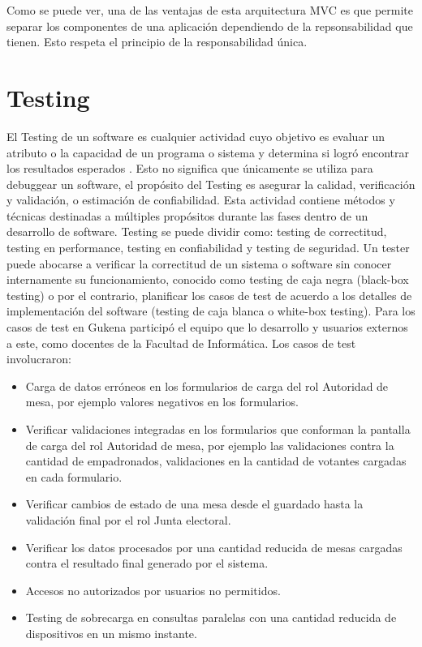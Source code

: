 Como se puede ver, una de las ventajas de esta arquitectura MVC es que permite separar los componentes de una aplicación dependiendo de la repsonsabilidad que tienen. Esto respeta el principio de la responsabilidad única.

\section{Testing}
El Testing de un software es cualquier actividad cuyo objetivo es evaluar un atributo o la capacidad de un programa o sistema y determina si logró encontrar los resultados esperados \cite{pan1999software}. Esto no significa que únicamente se utiliza para debuggear un software, el propósito del Testing es asegurar la calidad, verificación y validación, o estimación de confiabilidad. Esta actividad contiene métodos y técnicas destinadas a múltiples propósitos durante las fases dentro de un desarrollo de software. Testing se puede dividir como: testing de correctitud, testing en performance, testing en confiabilidad y testing de seguridad. Un tester puede abocarse a verificar la correctitud de un sistema o software sin conocer internamente su funcionamiento, conocido como testing de caja negra (black-box testing) o por el contrario, planificar los casos de test de acuerdo a los detalles de implementación del software (testing de caja blanca o white-box testing). \newline
Para los casos de test en Gukena participó el equipo que lo desarrollo y usuarios externos a este, como docentes de la Facultad de Informática. Los casos de test involucraron:
\begin{itemize}
    \item Carga de datos erróneos en los formularios de carga del rol Autoridad de mesa, por ejemplo valores negativos en los formularios.
    \item Verificar validaciones integradas en los formularios que conforman la pantalla de carga del rol Autoridad de mesa, por ejemplo las validaciones contra la cantidad de empadronados, validaciones en la cantidad de votantes cargadas en cada formulario.
    \item Verificar cambios de estado de una mesa desde el guardado hasta la validación final por el rol Junta electoral.
    \item Verificar los datos procesados por una cantidad reducida de mesas cargadas contra el resultado final generado por el sistema.
    \item Accesos no autorizados por usuarios no permitidos.
    \item Testing de sobrecarga en consultas paralelas con una cantidad reducida de dispositivos en un mismo instante.
\end{itemize}